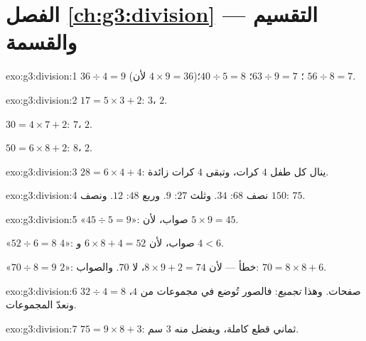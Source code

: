 \section*{الفصل \ref{ch:g3:division} --- التقسيم والقسمة}

\begin{solution}{exo:g3:division:1}
$36 \div 4 = 9$ (لأن $4 \times 9 = 36$)؛ \quad
$63 \div 9 = 7$؛ \quad $40 \div 5 = 8$؛ \quad $56 \div 8 = 7$.
\end{solution}

\begin{solution}{exo:g3:division:2}
$17 = 5 \times 3 + 2$:  $3$،  $2$.

$30 = 4 \times 7 + 2$:  $7$،  $2$.

$50 = 6 \times 8 + 2$:  $8$،  $2$.
\end{solution}

\begin{solution}{exo:g3:division:3}
$28 = 6 \times 4 + 4$: ينال كل طفل $4$ كرات، وتبقى $4$ كرات
زائدة.
\end{solution}

\begin{solution}{exo:g3:division:4}
نصف $68$: $34$. وثلث $27$: $9$. وربع $48$: $12$. ونصف
$150$: $75$.
\end{solution}

\begin{solution}{exo:g3:division:5}
«$45 \div 5 = 9$»: صواب، لأن $5 \times 9 = 45$.

«$52 \div 6 = 8$  $4$»: صواب، لأن $6 \times 8 + 4 = 52$ و
$4 < 6$.

«$70 \div 8 = 9$  $2$»: خطأ --- لأن $8 \times 9 + 2 = 74$،
لا $70$. والصواب: $70 = 8 \times 8 + 6$.
\end{solution}

\begin{solution}{exo:g3:division:6}
$32 \div 4 = 8$ صفحات. وهذا \emph{تجميع}: فالصور تُوضع في
مجموعات من $4$، ونعدّ المجموعات.
\end{solution}

\begin{solution}{exo:g3:division:7}
$75 = 9 \times 8 + 3$: ثماني قطع كاملة، ويفضل منه
$3$ سم.
\end{solution}


